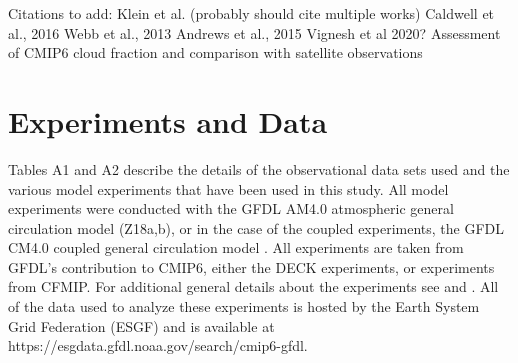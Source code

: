 \documentclass[draft]{agujournal2019}
\begin{document}
Citations to add: 
Klein et al. (probably should cite multiple works)
Caldwell et al., 2016
Webb et al., 2013
Andrews et al., 2015
Vignesh et al 2020?    Assessment of CMIP6 cloud fraction and comparison with satellite observations

\appendix
\section{Experiments and Data}

Tables A1 and A2 describe the details of the observational data sets used and the various model experiments that 
have been used in this study.  All model experiments were conducted with the GFDL AM4.0 atmospheric general 
circulation model (Z18a,b), or in the case of the coupled experiments, the GFDL CM4.0 coupled general circulation 
model \cite{Held_etal_2019}. 
All experiments are taken from GFDL's contribution to CMIP6, either the DECK experiments, or experiments from CFMIP.
For additional general details about the experiments see \cite{Eyring_etal_2016} and \cite{Webb_etal_2017}.  All of the 
data used to analyze these experiments is hosted by the Earth System Grid Federation (ESGF) and is available at 
https://esgdata.gfdl.noaa.gov/search/cmip6-gfdl.
\end{document}
